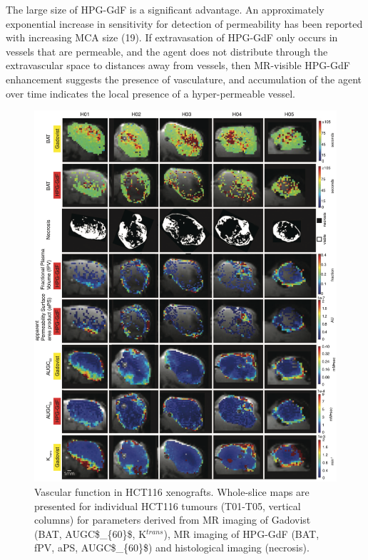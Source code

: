 The large size of \acs{HPG-GdF} is a significant advantage.
An approximately exponential increase in sensitivity for detection of permeability has been reported with increasing MCA size (19).
If extravasation of \acs{HPG-GdF} only occurs in vessels that are permeable, and the agent does not distribute through the extravascular space to distances away from vessels, then MR-visible \acs{HPG-GdF} enhancement suggests the presence of vasculature, and accumulation of the agent over time indicates the local presence of a hyper-permeable vessel.

\begin{figure}[htbp]
 \begin{center}
 \includegraphics[width=\textwidth]{hpg/hpg-paper1-images/hpg_fig7-hct116.png}
 \caption{Vascular function in HCT116 xenografts. Whole-slice maps are presented for individual HCT116 tumours (T01-T05, vertical columns) for parameters derived from MR imaging of Gadovist (BAT, \acs{AUGC$_{60}$}, K$^{trans}$), MR imaging of \acs{HPG-GdF} (\acs{BAT}, \acs{fPV}, \acs{aPS}, \acs{AUGC$_{60}$}) and histological imaging (necrosis).}
 \label{hpgpaper1:fig7}
 \end{center}
\end{figure}

